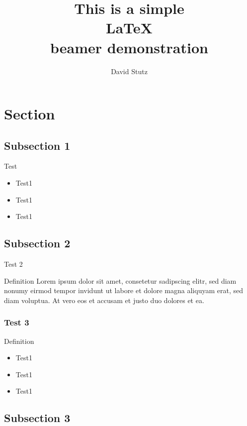 \documentclass[t]{beamer}
\title{This is a simple \\
\LaTeX{} \\
beamer demonstration}
\author{David Stutz}
\begin{document}
    \RWTHtitle
	
	\section{Section}

    \subsection{Subsection 1}

        \begin{frame}{Test}
            \begin{itemize}
                \item Test1
                \pause
                \item Test1
                \pause
                \item Test1
            \end{itemize}
        \end{frame}

    \subsection{Subsection 2}

        \begin{frame}{Test 2}
            \begin{block}{Definition}
                Lorem ipsum dolor sit amet, consetetur sadipscing elitr, sed diam nonumy eirmod tempor invidunt ut labore et dolore magna aliquyam erat, sed diam voluptua. At vero eos et accusam et justo duo dolores et ea.
            \end{block}
        \end{frame}

        \begin{frame}
            \frametitle{Test 3}
            \begin{block}{Definition}
            \begin{itemize}
                \item Test1
                \item Test1
                \item Test1
            \end{itemize}
            \end{block}
        \end{frame}

   \subsection{Subsection 3}
   
\end{document}
